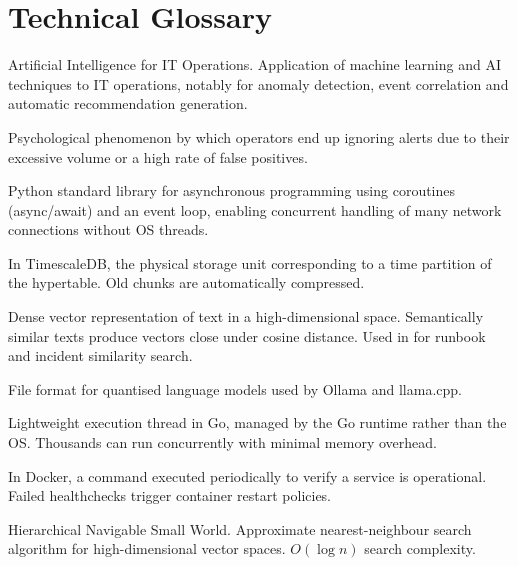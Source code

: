 \chapter{Technical Glossary}

\begin{description}[leftmargin=3.5cm, style=nextline, font=\bfseries\color{NavyBlue}]

  \item[AIOps]
    Artificial Intelligence for IT Operations. Application of machine learning
    and AI techniques to IT operations, notably for anomaly detection, event
    correlation and automatic recommendation generation.

  \item[Alert fatigue]
    Psychological phenomenon by which operators end up ignoring alerts due to
    their excessive volume or a high rate of false positives.

  \item[Asyncio]
    Python standard library for asynchronous programming using coroutines
    (async/await) and an event loop, enabling concurrent handling of many
    network connections without OS threads.

  \item[Chunk]
    In TimescaleDB, the physical storage unit corresponding to a time partition
    of the hypertable. Old chunks are automatically compressed.

  \item[Embedding]
    Dense vector representation of text in a high-dimensional space.
    Semantically similar texts produce vectors close under cosine distance.
    Used in \caimp{} for runbook and incident similarity search.

  \item[GGUF]
    File format for quantised language models used by Ollama and llama.cpp.

  \item[Goroutine]
    Lightweight execution thread in Go, managed by the Go runtime rather than
    the OS. Thousands can run concurrently with minimal memory overhead.

  \item[Healthcheck]
    In Docker, a command executed periodically to verify a service is
    operational. Failed healthchecks trigger container restart policies.

  \item[HNSW]
    Hierarchical Navigable Small World. Approximate nearest-neighbour search
    algorithm for high-dimensional vector spaces. $O(\log n)$ search complexity.


\end{description}
